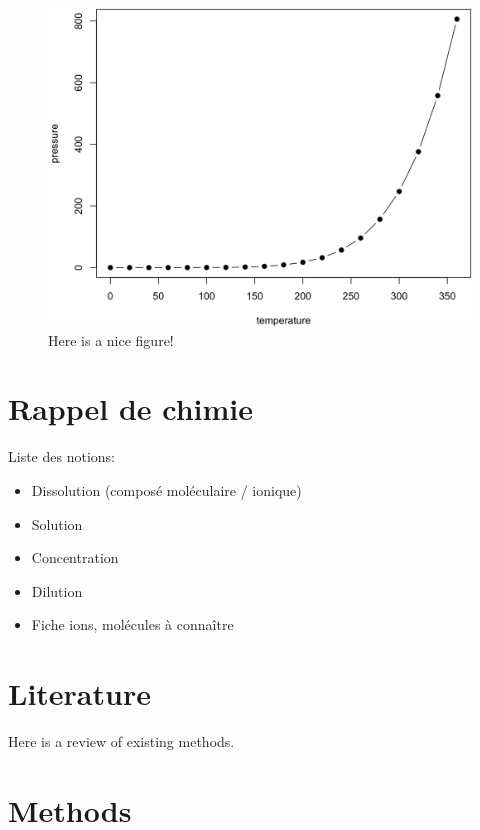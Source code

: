 \documentclass[
]{book}
\providecommand{\tightlist}{%
  \setlength{\itemsep}{0pt}\setlength{\parskip}{0pt}}
\def\tightlist{}
\begin{document}
\begin{figure}

{\centering \includegraphics[width=0.8\linewidth]{figures/fig} 

}

\caption{Here is a nice figure!}\label{fig:unnamed-chunk-9}
\end{figure}

\hypertarget{rappel-de-chimie}{%
\chapter{Rappel de chimie}\label{rappel-de-chimie}}

Liste des notions:

\begin{itemize}
\tightlist
\item
  Dissolution (composé moléculaire / ionique)
\item
  Solution
\item
  Concentration
\item
  Dilution
\item
  Fiche ions, molécules à connaître
\end{itemize}

\hypertarget{literature}{%
\chapter{Literature}\label{literature}}

Here is a review of existing methods.

\hypertarget{methods}{%
\chapter{Methods}\label{methods}}
\end{document}
